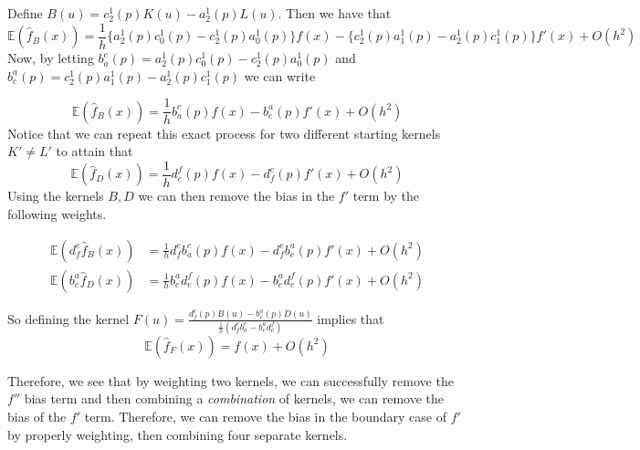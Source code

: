 \documentclass[12pt]{article}  %
\newcommand{\E}{{\mathbb{E}}}
\begin{document}
\begin{enumerate}
\begin{enumerate}
Define $B(u) = c_2^1(p)K(u) - a_2^1(p)L(u)$. Then we have that $$\E(\widehat{f}_B(x)) = \frac{1}{h}\{a_2^1(p)c_0^1(p) - c_2^1(p)a_0^1(p)\}f(x)-\{c_2^1(p)a_1^1(p) - a_2^1(p)c_1^1(p)\}f'(x) + O(h^2)$$
Now, by letting $b_a^c(p) = a_2^1(p)c_0^1(p) - c_2^1(p)a_0^1(p)$ and $b_c^a(p) = c_2^1(p)a_1^1(p) - a_2^1(p)c_1^1(p)$ we can write 

$$\E(\widehat{f}_B(x)) = \frac{1}{h}b_a^c(p)f(x) - b_c^a(p)f'(x) + O(h^2)$$
Notice that we can repeat this exact process for two different starting kernels $K'\neq L'$ to attain that $$\E(\widehat{f}_D(x)) = \frac{1}{h}d_e^f(p)f(x) - d_f^e(p)f'(x) + O(h^2)$$ Using the kernels $B,D$ we can then remove the bias in the $f'$ term by the following weights.  

\begin{align*}
\E(d_f^e\widehat{f}_B(x)) &= \frac{1}{h}d_f^eb_a^c(p)f(x) - d_f^eb_c^a(p)f'(x) + O(h^2)\\
\E(b_c^a\widehat{f}_D(x)) &= \frac{1}{h}b_c^ad_e^f(p)f(x) - b_c^ad_e^f(p)f'(x) + O(h^2)
\end{align*}

So defining the kernel $F(u) = \frac{d_f^e(p) B(u) - b_c^a(p)D(u)}{\frac{1}{h}(d_f^eb_a^c - b_c^ad_e^f)}$ implies that $$\E(\widehat{f}_{F}(x)) = f(x) + O(h^2)$$

Therefore, we see that by weighting two kernels, we can successfully remove the $f''$ bias term and then combining a \textit{combination} of kernels, we can remove the bias of the $f'$ term. Therefore, we can remove the bias in the boundary case of $f'$ by properly weighting, then combining four separate kernels. 
\end{enumerate}


\end{enumerate}
\end{document}
